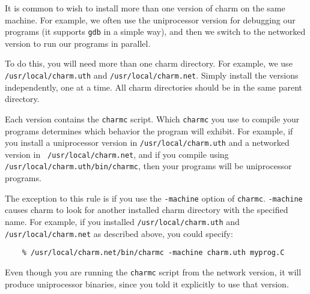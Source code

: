It is common to wish to install more than one version of charm on the
same machine.  For example, we often use the uniprocessor version for
debugging our programs (it supports {\tt gdb} in a simple way), and
then we switch to the networked version to run our programs in
parallel.

To do this, you will need more than one charm directory.  For example,
we use {\tt /usr/local/charm.uth} and {\tt /usr/local/charm.net}.
Simply install the versions independently, one at a time.  All charm
directories should be in the same parent directory.

Each version contains the {\tt charmc} script.  Which {\tt charmc} you
use to compile your programs determines which behavior the program
will exhibit.  For example, if you install a uniprocessor version in
{\tt /usr/local/charm.uth} and a networked version in {\tt
/usr/local/charm.net}, and if you compile using {\tt
/usr/local/charm.uth/bin/charmc}, then your programs will be
uniprocessor programs.

The exception to this rule is if you use the {\tt -machine} option of
{\tt charmc}.  {\tt -machine} causes charm to look for another
installed charm directory with the specified name.  For example, if
you installed {\tt /usr/local/charm.uth} and {\tt
/usr/local/charm.net} as described above, you could specify:

\begin{verbatim}
    % /usr/local/charm.net/bin/charmc -machine charm.uth myprog.C
\end{verbatim}

Even though you are running the {\tt charmc} script from the network
version, it will produce uniprocessor binaries, since you told it
explicitly to use that version.



